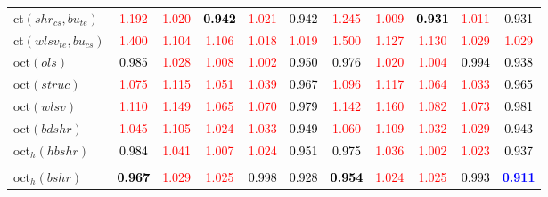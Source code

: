\begin{tabular}[t]{l|>{}cccc>{}c|ccccc}
ct$(shr_{cs}, bu_{te})$ & \textcolor{red}{1.192} & \textcolor{red}{1.020} & \textcolor{black}{\textbf{0.942}} & \textcolor{red}{1.021} & \textcolor{black}{0.942} & \textcolor{red}{1.245} & \textcolor{red}{1.009} & \textcolor{black}{\textbf{0.931}} & \textcolor{red}{1.011} & \textcolor{black}{0.931}\\
ct$(wlsv_{te}, bu_{cs})$ & \textcolor{red}{1.400} & \textcolor{red}{1.104} & \textcolor{red}{1.106} & \textcolor{red}{1.018} & \textcolor{red}{1.019} & \textcolor{red}{1.500} & \textcolor{red}{1.127} & \textcolor{red}{1.130} & \textcolor{red}{1.029} & \textcolor{red}{1.029}\\
oct$(ols)$ & \textcolor{black}{0.985} & \textcolor{red}{1.028} & \textcolor{red}{1.008} & \textcolor{red}{1.002} & \textcolor{black}{0.950} & \textcolor{black}{0.976} & \textcolor{red}{1.020} & \textcolor{red}{1.004} & \textcolor{black}{0.994} & \textcolor{black}{0.938}\\
oct$(struc)$ & \textcolor{red}{1.075} & \textcolor{red}{1.115} & \textcolor{red}{1.051} & \textcolor{red}{1.039} & \textcolor{black}{0.967} & \textcolor{red}{1.096} & \textcolor{red}{1.117} & \textcolor{red}{1.064} & \textcolor{red}{1.033} & \textcolor{black}{0.965}\\
oct$(wlsv)$ & \textcolor{red}{1.110} & \textcolor{red}{1.149} & \textcolor{red}{1.065} & \textcolor{red}{1.070} & \textcolor{black}{0.979} & \textcolor{red}{1.142} & \textcolor{red}{1.160} & \textcolor{red}{1.082} & \textcolor{red}{1.073} & \textcolor{black}{0.981}\\
oct$(bdshr)$ & \textcolor{red}{1.045} & \textcolor{red}{1.105} & \textcolor{red}{1.024} & \textcolor{red}{1.033} & \textcolor{black}{0.949} & \textcolor{red}{1.060} & \textcolor{red}{1.109} & \textcolor{red}{1.032} & \textcolor{red}{1.029} & \textcolor{black}{0.943}\\
oct$_h(hbshr)$ & \textcolor{black}{0.984} & \textcolor{red}{1.041} & \textcolor{red}{1.007} & \textcolor{red}{1.024} & \textcolor{black}{0.951} & \textcolor{black}{0.975} & \textcolor{red}{1.036} & \textcolor{red}{1.002} & \textcolor{red}{1.023} & \textcolor{black}{0.937}\\[-1.5ex]
\hline\\[-1.5ex]
oct$_h(bshr)$ & \textcolor{black}{\textbf{0.967}} & \textcolor{red}{1.029} & \textcolor{red}{1.025} & \textcolor{black}{0.998} & \textcolor{black}{0.928} & \textcolor{black}{\textbf{0.954}} & \textcolor{red}{1.024} & \textcolor{red}{1.025} & \textcolor{black}{0.993} & \textcolor{blue}{\textbf{0.911}}\\

\end{tabular}
